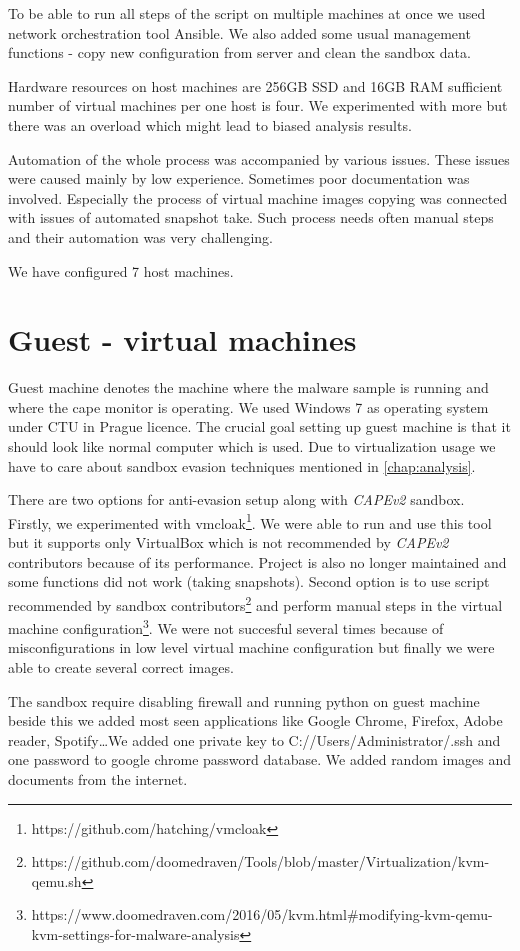 To be able to run all steps of the script on multiple machines at once we used network orchestration tool Ansible. We also added some usual management functions - copy new configuration from server and clean the sandbox data.

Hardware resources on host machines are 256GB SSD and 16GB RAM sufficient number of virtual machines per one host is four. We experimented with more but there was an overload which might lead to biased analysis results.

Automation of the whole process was accompanied by various issues. These issues were caused mainly by low experience. Sometimes poor documentation was involved. Especially the process of virtual machine images copying was connected with issues of automated snapshot take. Such process needs often manual steps and their automation was very challenging.

We have configured 7 host machines.

\section{Guest - virtual machines}
Guest machine denotes the machine where the malware sample is running and where the cape monitor is operating. We used Windows 7 as operating system under CTU in Prague licence. The crucial goal setting up guest machine is that it should look like normal computer which is used. Due to virtualization usage we have to care about sandbox evasion techniques mentioned in \ref{chap:analysis}.

There are two options for anti-evasion setup along with \emph{CAPEv2} sandbox. Firstly, we experimented with vmcloak\footnote{https://github.com/hatching/vmcloak}. We were able to run and use this tool but it supports only VirtualBox which is not recommended by \emph{CAPEv2} contributors because of its performance. Project is also no longer maintained and some functions did not work (taking snapshots). Second option is to use script recommended by sandbox contributors\footnote{https://github.com/doomedraven/Tools/blob/master/Virtualization/kvm-qemu.sh} and perform manual steps in the virtual machine configuration\footnote{https://www.doomedraven.com/2016/05/kvm.html#modifying-kvm-qemu-kvm-settings-for-malware-analysis}. We were not succesful several times because of misconfigurations in low level virtual machine configuration but finally we were able to create several correct images.

The sandbox require disabling firewall and running python on guest machine beside this we added most seen applications like Google Chrome, Firefox, Adobe reader, Spotify\dots We added one private key to C://Users/Administrator/.ssh and one password to google chrome password database. We added random images and documents from the internet.

